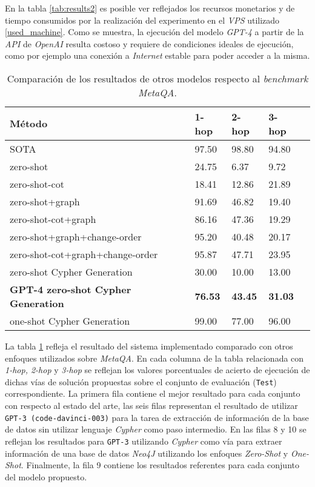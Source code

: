 En la tabla \ref{tab:results2} es posible ver reflejados los recursos monetarios y de tiempo consumidos por la realización del experimento en el \textit{VPS} utilizado \ref{used_machine}. Como se muestra, la ejecución del modelo \textit{GPT-4} a partir de la \textit{API} de \textit{OpenAI} resulta costoso y requiere de condiciones ideales de ejecución, como por ejemplo una conexión a \textit{Internet} estable para poder acceder a la misma.

\begin{table}[H]
\centering
\begin{tabular}{|l|l|l|l|l}
\hline
Método & 1-hop & 2-hop & 3-hop \\
\hline
SOTA  & 97.50 & 98.80 & 94.80 \\
\hline
zero-shot  & 24.75 & 6.37 & 9.72 \\
\hline
zero-shot-cot & 18.41 & 12.86 & 21.89 \\
\hline
zero-shot+graph & 91.69 & 46.82 & 19.40 \\
\hline
zero-shot-cot+graph & 86.16 & 47.36 & 19.29 \\
\hline
zero-shot+graph+change-order & 95.20 & 40.48 & 20.17 \\
\hline
zero-shot-cot+graph+change-order & 95.87 & 47.71 & 23.95 \\
\hline
zero-shot Cypher Generation  & 30.00 & 10.00 & 13.00 \\
\hline
\textbf{GPT-4 zero-shot Cypher Generation}  & \textbf{76.53} & \textbf{43.45} & \textbf{31.03} \\
\hline
one-shot Cypher Generation & 99.00 & 77.00 & 96.00 \\
\hline
\end{tabular}
\caption{Comparación de los resultados de otros modelos respecto al \textit{benchmark MetaQA}.}
\label{tab:results3}
\end{table}

La tabla \ref{tab:results3} refleja el resultado del sistema implementado comparado con otros enfoques utilizados sobre \textit{MetaQA}. En cada columna de la tabla relacionada con \textit{1-hop, 2-hop} y \textit{3-hop} se reflejan los valores porcentuales de acierto de ejecución de dichas vías de solución propuestas sobre el conjunto de evaluación (\texttt{Test}) correspondiente. La primera fila contiene el mejor resultado para cada conjunto con respecto al estado del arte, las seis filas representan el resultado de utilizar \texttt{GPT-3 (code-davinci-003)} para la tarea de extracción de información de la base de datos sin utilizar lenguaje \textit{Cypher} como paso intermedio. En las filas 8 y 10 se reflejan los resultados para \texttt{GPT-3} utilizando \textit{Cypher} como vía para extraer información de una base de datos \textit{Neo4J} utilizando los enfoques \textit{Zero-Shot} y \textit{One-Shot}. Finalmente, la fila 9 contiene los resultados referentes para cada conjunto del modelo propuesto.

